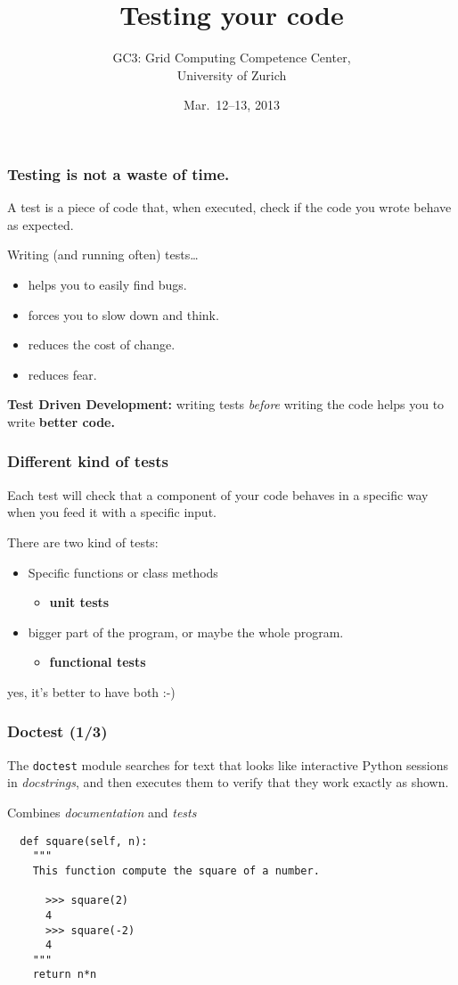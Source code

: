 \documentclass[english,serif,mathserif,xcolor=pdftex,dvipsnames,table]{beamer}
\title[Testing]{%
  Testing your code
}
\author[GC3]{%
  GC3: Grid Computing Competence Center, \\
  University of Zurich
}
\date{Mar.~12--13, 2013}
\begin{document}
\maketitle


\begin{frame}
  \frametitle{Testing is \textbf{not} a waste of time.}
  A test is a piece of code that, when executed, check if the code you
  wrote behave as expected.

  \+
  Writing (and running often) tests\ldots
  \begin{itemize}
  \item helps you to easily find bugs.
  \item forces you to slow down and think.
  \item reduces the cost of change.
  \item reduces fear.
  \end{itemize}

  \+ \textbf{Test Driven Development:} writing tests \textit{before}
  writing the code helps you to write \textbf{better code.}
\end{frame}


\begin{frame}
  \frametitle{Different kind of tests} 

  Each test will check that a component of your code behaves in a
  specific way when you feed it with a specific input.

  \+
  There are two kind of tests:
  \begin{itemize}
  \item Specific functions or class methods
    \begin{itemize}
    \item \textbf{unit tests}
    \end{itemize}
  \item bigger part of the program, or maybe the whole program.
    \begin{itemize}
    \item \textbf{functional tests}
    \end{itemize}
  \end{itemize}

  \+
  \pause
  yes, it's better to have both :-)
\end{frame}


\begin{frame}[fragile]
  \frametitle{Doctest (1/3)}

  The \lstinline|doctest| module searches for text that looks like
  interactive Python sessions in \textit{docstrings}, and then
  executes them to verify that they work exactly as shown.

  \+
  Combines \textit{documentation} and \textit{tests}
  \begin{lstlisting}
  def square(self, n):
    """
    This function compute the square of a number.

      >>> square(2)
      4
      >>> square(-2)
      4
    """
    return n*n
  \end{lstlisting}
\end{frame}
\end{document}
